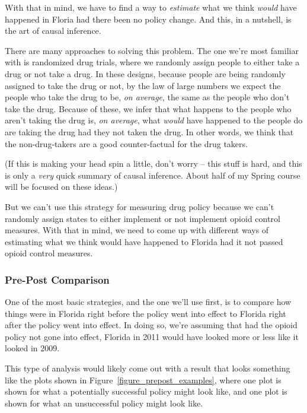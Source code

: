 \documentclass[12pt]{article}
\begin{document}
With that in mind, we have to find a way to \emph{estimate} what we think \emph{would} have happened in Floria had there been no policy change. And this, in a nutshell, is the art of causal inference.

There are many approaches to solving this problem. The one we're most familiar with is randomized drug trials, where we randomly assign people to either take a drug or not take a drug. In these designs, because people are being randomly assigned to take the drug or not, by the law of large numbers we expect the people who take the drug to be, \emph{on average}, the same as the people who don't take the drug. Because of these, we infer that what happens to the people who aren't taking the drug is, \emph{on average}, what \emph{would} have happened to the people do are taking the drug had they not taken the drug. In other words, we think that the non-drug-takers are a good counter-factual for the drug takers.

(If this is making your head spin a little, don't worry -- this stuff is hard, and this is only a \emph{very} quick summary of causal inference. About half of my Spring course will be focused on these ideas.)

But we can't use this strategy for measuring drug policy because we can't randomly assign states to either implement or not implement opioid control measures. With that in mind, we need to come up with different ways of estimating what we think would have happened to Florida had it not passed opioid control measures.

\subsubsection*{Pre-Post Comparison}

One of the most basic strategies, and the one we'll use first, is to compare how things were in Florida right before the policy went into effect to Florida right after the policy went into effect. In doing so, we're assuming that had the opioid policy not gone into effect, Florida in 2011 would have looked more or less like it looked in 2009.

This type of analysis would likely come out with a result that looks something like the plots shown in Figure~\ref{figure_prepost_examples}, where one plot is shown for what a potentially successful policy might look like, and one plot is shown for what an unsuccessful policy might look like.
\end{document}
